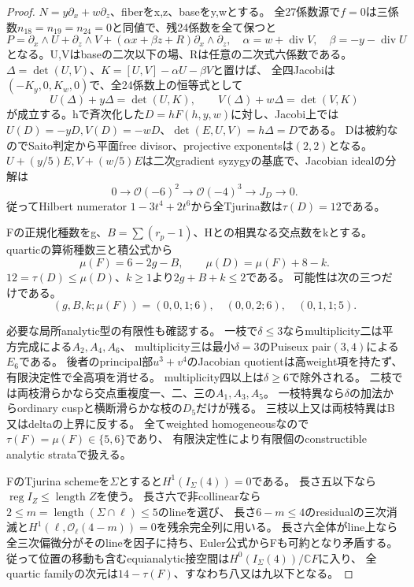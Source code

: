 \documentclass[a4paper,11pt]{ltjsarticle}
\theoremstyle{definition}
\begin{document}
\begin{proof}
$N=y\partial_x+w\partial_z$、fiberをx,z、baseをy,wとする。
全27係数源で$f=0$は三係数$n_{18}=n_{19}=n_{24}=0$と同値で、残24係数を全て保つと
\[
 P=\partial_x\wedge U+\partial_z\wedge V+
       (\alpha x+\beta z+R)\partial_x\wedge\partial_z,
 \quad \alpha=w+\operatorname{div}V,\quad\beta=-y-\operatorname{div}U
\]
となる。U,Vはbaseの二次以下の場、Rは任意の二次式六係数である。
$\Delta=\det(U,V)$、$K=[U,V]-\alpha U-\beta V$と置けば、
全四Jacobiは$(-K_y,0,K_w,0)$で、全24係数上の恒等式として
\[
 U(\Delta)+y\Delta=\det(U,K),\qquad
 V(\Delta)+w\Delta=\det(V,K)
\]
が成立する。hで斉次化した$D=hF(h,y,w)$に対し、Jacobi上では
$U(D)=-yD,V(D)=-wD$、$\det(E,U,V)=h\Delta=D$である。
Dは被約なのでSaito判定から平面free divisor、projective exponentsは$(2,2)$となる。
$U+(y/5)E,V+(w/5)E$は二次gradient syzygyの基底で、Jacobian idealの分解は
\[
 0\to\mathcal O(-6)^2\to\mathcal O(-4)^3\to J_D\to0.
\]
従ってHilbert numerator $1-3t^4+2t^6$から全Tjurina数は$\tau(D)=12$である。

Fの正規化種数をg、$B=\sum(r_p-1)$、Hとの相異なる交点数をkとする。
quarticの算術種数三と積公式から
\[
 \mu(F)=6-2g-B,\qquad \mu(D)=\mu(F)+8-k.
\]
$12=\tau(D)\le\mu(D)$、$k\ge1$より$2g+B+k\le2$である。
可能性は次の三つだけである。
\[
 (g,B,k;\mu(F))=(0,0,1;6),\quad(0,0,2;6),\quad(0,1,1;5).
\]

必要な局所analytic型の有限性も確認する。
一枝で$\delta\le3$ならmultiplicity二は平方完成による$A_2,A_4,A_6$、
multiplicity三は最小$\delta=3$のPuiseux pair$(3,4)$による$E_6$である。
後者のprincipal部$u^3+v^4$のJacobian quotientは高weight項を持たず、有限決定性で全高項を消せる。
multiplicity四以上は$\delta\ge6$で除外される。
二枝では両枝滑らかなら交点重複度一、二、三の$A_1,A_3,A_5$。
一枝特異なら$\delta$の加法からordinary cuspと横断滑らかな枝の$D_5$だけが残る。
三枝以上又は両枝特異はB又はdeltaの上界に反する。
全てweighted homogeneousなので$\tau(F)=\mu(F)\in\{5,6\}$であり、
有限決定性により有限個のconstructible analytic strataで扱える。

FのTjurina schemeを$\Sigma$とすると$H^1(I_\Sigma(4))=0$である。
長さ五以下なら$\operatorname{reg}I_Z\le\operatorname{length}Z$を使う。
長さ六で非collinearなら$2\le m=\operatorname{length}(\Sigma\cap\ell)\le5$のlineを選び、
長さ$6-m\le4$のresidualの三次消滅と$H^1(\ell,\mathcal O_\ell(4-m))=0$を残余完全列に用いる。
長さ六全体がline上なら全三次偏微分がそのlineを因子に持ち、Euler公式からFも可約となり矛盾する。
従って位置の移動も含むequianalytic接空間は$H^0(I_\Sigma(4))/\mathbb CF$に入り、
全quartic familyの次元は$14-\tau(F)$、すなわち八又は九以下となる。


\end{proof}
\end{document}
